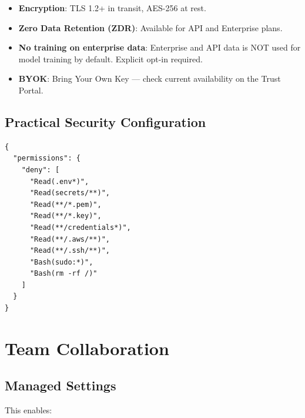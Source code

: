 \begin{itemize}
  \item \textbf{Encryption}: TLS 1.2+ in transit, AES-256 at rest.
  \item \textbf{Zero Data Retention (ZDR)}: Available for API and Enterprise plans.
  \item \textbf{No training on enterprise data}: Enterprise and API data is NOT
    used for model training by default. Explicit opt-in required.
  \item \textbf{BYOK}: Bring Your Own Key --- check current availability on the Trust Portal.
\end{itemize}


\subsection{Practical Security Configuration}


\begin{verbatim}
{
  "permissions": {
    "deny": [
      "Read(.env*)",
      "Read(secrets/**)",
      "Read(**/*.pem)",
      "Read(**/*.key)",
      "Read(**/credentials*)",
      "Read(**/.aws/**)",
      "Read(**/.ssh/**)",
      "Bash(sudo:*)",
      "Bash(rm -rf /)"
    ]
  }
}
\end{verbatim}

\section{Team Collaboration}
\label{sec:team-collab}


\subsection{Managed Settings}

 This enables:

